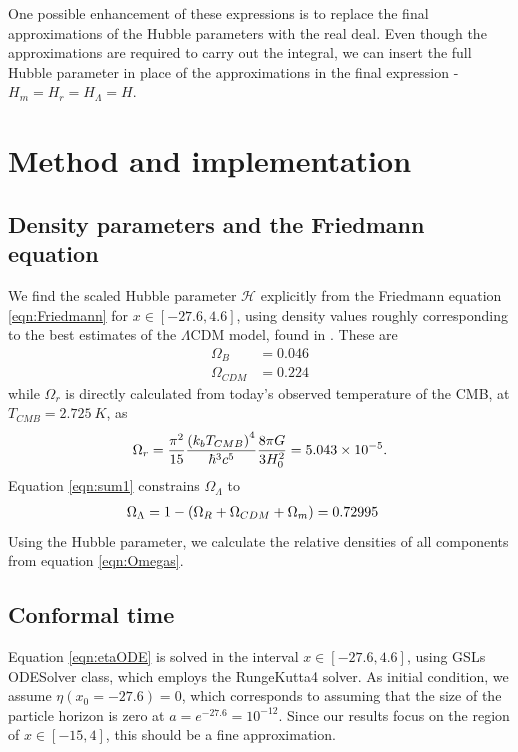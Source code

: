 \documentclass[10pt, a4paper]{article}
\begin{document}
One possible enhancement of these expressions is to replace the final approximations of the Hubble parameters with the real deal. Even though the approximations are required to carry out the integral, we can insert the full Hubble parameter in place of the approximations in the final expression - $H_m = H_r = H_{\Lambda} = H$.


\section{Method and implementation}
\subsection{Density parameters and the Friedmann equation}
We find the scaled Hubble parameter $\mathcal{H}$ explicitly from the Friedmann equation \ref{eqn:Friedmann} for $x \in [-27.6, 4.6]$, using density values roughly corresponding to the best estimates of the $\Lambda$CDM model, found in \cite{callin2006}. These are
\begin{align*}
    \Omega_B &= 0.046 \\
    \Omega_{CDM} &= 0.224
\end{align*}
while $\Omega_r$ is directly calculated from today's observed temperature of the CMB, at $T_{CMB} = \SI{2.725}{K}$, as
\begin{align*}
    \Omega_r = \frac{\pi^2}{15}\frac{\qty(k_bT_{CMB})^4}{\hbar^3c^5}\frac{8\pi G}{3H_0^2} = 5.043 \times 10^{-5}.
\end{align*}
Equation \ref{eqn:sum1} constrains $\Omega_\Lambda$ to
\begin{align*}
    \Omega_{\Lambda} &= 1 - \qty(\Omega_R + \Omega_{CDM} + \Omega_m) = 0.72995
\end{align*}
Using the Hubble parameter, we calculate the relative densities of all components from equation \ref{eqn:Omegas}.


\subsection{Conformal time}
Equation \ref{eqn:etaODE} is solved in the interval $x \in [-27.6, 4.6]$, using GSLs ODESolver class, which employs the RungeKutta4 solver. As initial condition, we assume $\eta(x_0 = -27.6) = 0$, which corresponds to assuming that the size of the particle horizon is zero at $a=e^{-27.6} = 10^{-12}$. Since our results focus on the region of $x \in [-15, 4]$, this should be a fine approximation.
\end{document}
